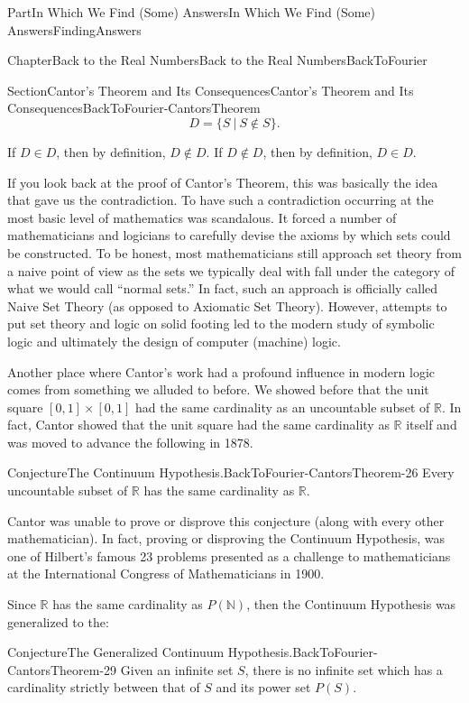 \documentclass[oneside,10pt,]{book}
\numberwithin{equation}{part}
\newcommand{\RR}{\mathbb {R}}
\newcommand{\NN}{\mathbb {N}}
\begin{document}
\begin{partptx}{Part}{In Which We Find (Some) Answers}{}{In Which We Find (Some) Answers}{}{}{FindingAnswers}
\begin{chapterptx}{Chapter}{Back to the Real Numbers}{}{Back to the Real Numbers}{}{}{BackToFourier}
\begin{sectionptx}{Section}{Cantor's Theorem and Its Consequences}{}{Cantor's Theorem and Its Consequences}{}{}{BackToFourier-CantorsTheorem}
\begin{equation*}
D=\{S\ |\ S\not \in S\} \text{.}
\end{equation*}
%
\par
If \(D\in D\), then by definition, \(D\not\in D\).  If \(D\not\in D\), then by definition, \(D\in D\).%
\par
If you look back at the proof of Cantor's Theorem, this was basically the idea that gave us the contradiction.  To have such a contradiction occurring at the most basic level of mathematics was scandalous.  It forced a number of mathematicians and logicians to carefully devise the axioms by which sets could be constructed.  To be honest, most mathematicians still approach set theory from a naive point of view as the sets we typically deal with fall under the category of what we would call ``normal sets.'' In fact, such an approach is officially called Naive Set Theory (as opposed to Axiomatic Set Theory). However, attempts to put set theory and logic on solid footing led to the modern study of symbolic logic and ultimately the design of computer (machine) logic.%
\par
Another place where Cantor's work had a profound influence in modern logic comes from something we alluded to before.  We showed before that the unit square \([0,1]\times [0,1]\) had the same cardinality as an uncountable subset of \(\RR\).  In fact, Cantor  showed that the unit square had the same cardinality as \(\RR\) itself and was moved to advance the following in 1878.%
\begin{conjecture}{Conjecture}{The Continuum Hypothesis.}{}{BackToFourier-CantorsTheorem-26}%
%
Every uncountable subset of \(\RR\) has the same cardinality as \(\RR\).%
\end{conjecture}
Cantor was unable to prove or disprove this conjecture (along with every other mathematician).  In fact, proving or disproving the Continuum Hypothesis, was one of Hilbert's famous 23 problems presented as a challenge to mathematicians at the International Congress of Mathematicians in 1900.%
\par
Since \(\RR\) has the same cardinality as \(P(\NN)\), then the Continuum Hypothesis was generalized to the:%
\begin{conjecture}{Conjecture}{The Generalized Continuum Hypothesis.}{}{BackToFourier-CantorsTheorem-29}%
%
Given an infinite set \(S\), there is no infinite set which has a cardinality strictly between that of \(S\) and its power set \(P(S)\).%

\end{conjecture}
\end{sectionptx}
\end{chapterptx}
\end{partptx}
\end{document}
